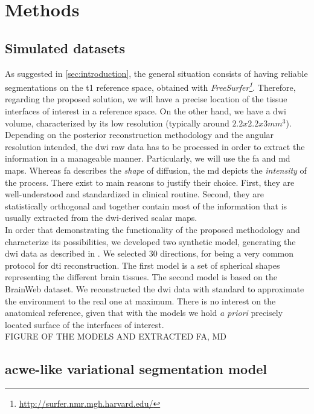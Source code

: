 \section{Methods}
\label{sec:methods}
%
\subsection{Simulated datasets}
%
As suggested in \autoref{sec:introduction}, the general situation 
consists of having reliable segmentations on the \ac{t1} reference
space, obtained with 
\emph{FreeSurfer\footnote{\url{http://surfer.nmr.mgh.harvard.edu/}}}.
Therefore, regarding the proposed solution, we will have a precise
location of the tissue interfaces of interest in a reference space.
On the other hand, we have a \ac{dwi} volume, characterized by its
low resolution (typically around $2.2x2.2x3mm^3$). Depending on the
posterior reconstruction methodology and the angular resolution
intended, the \ac{dwi} raw data has to be processed in order to
extract the information in a manageable manner. Particularly, we
will use the \ac{fa} and \ac{md} maps. Whereas \ac{fa} describes
the \emph{shape} of diffusion, the \ac{md} depicts the
\emph{intensity} of the process. There exist to main reasons to 
justify their choice. First, they are well-understood and
standardized in clinical routine. Second, they are statistically 
orthogonal and together contain most of the information that is
usually extracted from the \ac{dwi}-derived scalar maps. \\
In order that demonstrating the functionality of the proposed
methodology and characterize its possibilities, we developed two
synthetic model, generating the \ac{dwi} data as described in
 \citep{tuch_q-ball_2004}. We selected 30 directions, for being
a very common protocol for \ac{dti} reconstruction. The first model
is a set of spherical shapes representing the different brain
tissues. The second model is based on the BrainWeb dataset. We
reconstructed the \ac{dwi} data with standard to approximate the
environment to the real one at maximum. There is no interest on the
anatomical reference, given that with the models we hold \emph{a priori}
precisely located surface of the interfaces of interest. \\

FIGURE OF THE MODELS AND EXTRACTED FA, MD

\subsection{\acl{acwe}-like variational segmentation model}

